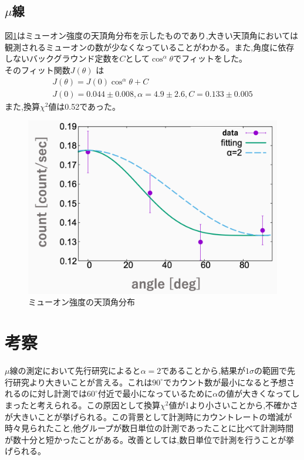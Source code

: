 \documentclass[a4j]{jsarticle}
\begin{document}
	\subsection{$\mu$線}
	図\ref{mu1}はミューオン強度の天頂角分布を示したものであり,大きい天頂角においては観測されるミューオンの数が少なくなっていることがわかる。また,角度に依存しないバックグラウンド定数を$C$として$\cos^{\alpha} \theta$でフィットをした。\\
	そのフィット関数$J(\theta)$ は
	\begin{gather}
	J(\theta) = J(0)\cos^{\alpha} \theta + C\\
	J(0) = 0.044 \pm 0.008 , \alpha = 4.9 \pm 2.6 , C = 0.133 \pm 0.005
	\end{gather}
	また,換算$\chi^2$値は0.52であった。
	\begin{figure}[htbp]
	\centering
	\includegraphics[width=12cm]{muon_distribution.png}
	\caption{ミューオン強度の天頂角分布}
	\label{mu1}
	\end{figure}
	
\section{考察}
$\mu$線の測定において先行研究によると$\alpha = 2$であることから,結果が$1\sigma$の範囲で先行研究より大きいことが言える。これは$90^{\circ}$でカウント数が最小になると予想されるのに対し計測では$60^{\circ}$付近で最小になっているために$\alpha$の値が大きくなってしまったと考えられる。この原因として換算$\chi^2$値が1より小さいことから,不確かさが大きいことが挙げられる。この背景として計測時にカウントレートの増減が時々見られたこと,他グループが数日単位の計測であったことに比べて計測時間が数十分と短かったことがある。改善としては,数日単位で計測を行うことが挙げられる。
\end{document}
